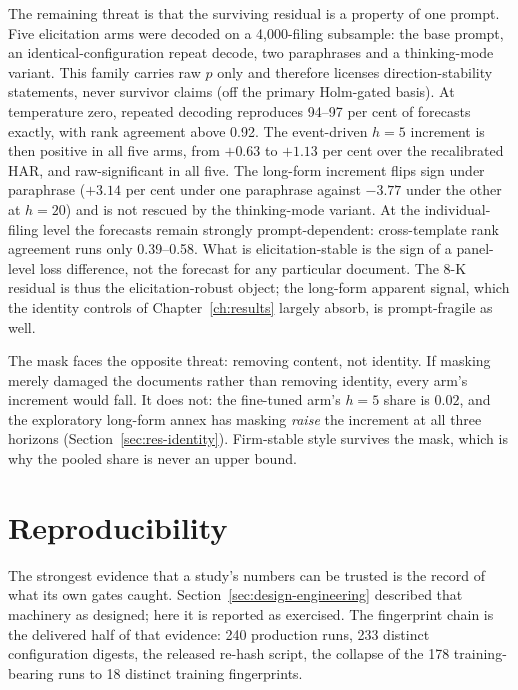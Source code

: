 The remaining threat is that the surviving residual is a property of one prompt. Five elicitation arms were decoded on a 4{,}000-filing subsample: the base prompt, an identical-configuration repeat decode, two paraphrases and a thinking-mode variant. This family carries raw $p$ only and therefore licenses direction-stability statements, never survivor claims (off the primary Holm-gated basis). %
At temperature zero, repeated decoding reproduces 94--97 per cent of forecasts exactly, with rank agreement above 0.92. %
The event-driven $h{=}5$ increment is then positive in all five arms, from $+0.63$ to $+1.13$ per cent over the recalibrated HAR, and raw-significant in all five. The long-form increment flips sign under paraphrase ($+3.14$ per cent under one paraphrase against $-3.77$ under the other at $h{=}20$) and is not rescued by the thinking-mode variant. %
At the individual-filing level the forecasts remain strongly prompt-dependent: cross-template rank agreement runs only 0.39--0.58. What is elicitation-stable is the sign of a panel-level loss difference, not the forecast for any particular document. %
The 8-K residual is thus the elicitation-robust object; the long-form apparent signal, which the identity controls of Chapter~\ref{ch:results} largely absorb, is prompt-fragile as well.

The mask faces the opposite threat: removing content, not identity. If masking merely damaged the documents rather than removing identity, every arm's increment would fall. It does not: the fine-tuned arm's $h{=}5$ share is $0.02$, %
and the exploratory long-form annex has masking \emph{raise} the increment at all three horizons (Section~\ref{sec:res-identity}). %
Firm-stable style survives the mask, which is why the pooled share is never an upper bound.

\section{Reproducibility}
\label{sec:val-repro}

The strongest evidence that a study's numbers can be trusted is the record of what its own gates caught. Section~\ref{sec:design-engineering} described that machinery as designed; here it is reported as exercised. The fingerprint chain is the delivered half of that evidence: 240 production runs, 233 distinct configuration digests, the released re-hash script, the collapse of the 178 training-bearing runs to 18 distinct training fingerprints. %

